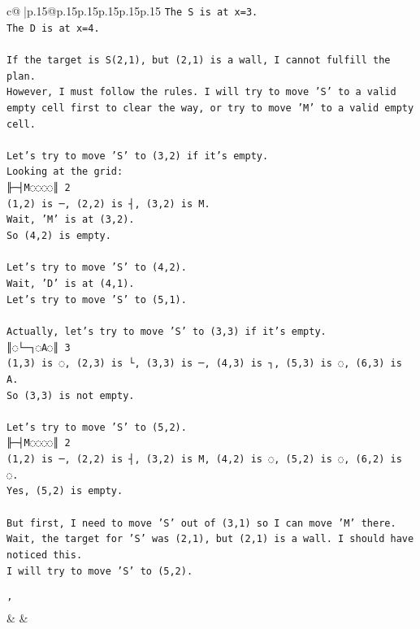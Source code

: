 \documentclass{article}
\begin{document}
{\begin{supertabular}{c@{$\;$}|p{.15\linewidth}@{}p{.15\linewidth}p{.15\linewidth}p{.15\linewidth}p{.15\linewidth}p{.15\linewidth}}
{{{\texttt{The S is at x=3.} \\
\texttt{The D is at x=4.} \\
\\ 
\texttt{If the target is S(2,1), but (2,1) is a wall, I cannot fulfill the plan.} \\
\texttt{However, I must follow the rules. I will try to move 'S' to a valid empty cell first to clear the way, or try to move 'M' to a valid empty cell.} \\
\\ 
\texttt{Let's try to move 'S' to (3,2) if it's empty.} \\
\texttt{Looking at the grid:} \\
\texttt{╟─┤M◌◌◌◌║ 2} \\
\texttt{(1,2) is ─, (2,2) is ┤, (3,2) is M.} \\
\texttt{Wait, 'M' is at (3,2).} \\
\texttt{So (4,2) is empty.} \\
\\ 
\texttt{Let's try to move 'S' to (4,2).} \\
\texttt{Wait, 'D' is at (4,1).} \\
\texttt{Let's try to move 'S' to (5,1).} \\
\\ 
\texttt{Actually, let's try to move 'S' to (3,3) if it's empty.} \\
\texttt{║◌└─┐◌A◌║ 3} \\
\texttt{(1,3) is ◌, (2,3) is └, (3,3) is ─, (4,3) is ┐, (5,3) is ◌, (6,3) is A.} \\
\texttt{So (3,3) is not empty.} \\
\\ 
\texttt{Let's try to move 'S' to (5,2).} \\
\texttt{╟─┤M◌◌◌◌║ 2} \\
\texttt{(1,2) is ─, (2,2) is ┤, (3,2) is M, (4,2) is ◌, (5,2) is ◌, (6,2) is ◌.} \\
\texttt{Yes, (5,2) is empty.} \\
\\ 
\texttt{But first, I need to move 'S' out of (3,1) so I can move 'M' there.} \\
\texttt{Wait, the target for 'S' was (2,1), but (2,1) is a wall. I should have noticed this.} \\
\texttt{I will try to move 'S' to (5,2).} \\
\\ 
\texttt{'} \\
            }
        }
    }
    & & \\ \\


\end{supertabular}}
\end{document}
